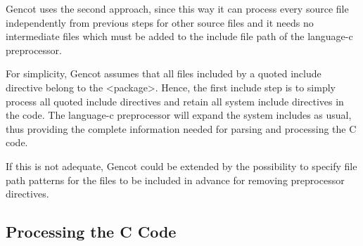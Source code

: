 Gencot uses the second approach, since this way it can process every source file independently from previous steps for 
other source files and it needs no intermediate files which must be added to the include file path of the language-c
preprocessor.

For simplicity, Gencot assumes that all files included by a quoted include directive belong to the <package>. Hence,
the first include step is to simply process all quoted include directives and retain all system include directives in
the code. The language-c preprocessor will expand the system includes as usual, thus providing the complete 
information needed for parsing and processing the C code.

If this is not adequate, Gencot could be extended by the possibility to specify file path patterns for the files to
be included in advance for removing preprocessor directives.

\subsection{Processing the C Code}



 
